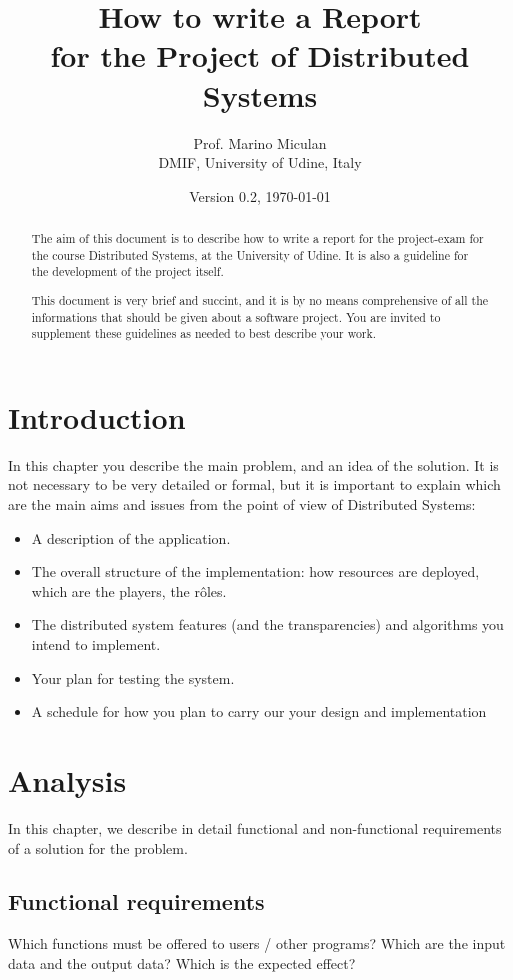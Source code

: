 \documentclass{memoir}
\title{How to write a Report\\ for the Project of Distributed Systems}
\author{Prof. Marino Miculan\\ DMIF, University of Udine, Italy}
\date{Version 0.2, \today}
\begin{document}
\maketitle
\begin{abstract}
The aim of this document is to describe how to write a report for the project-exam for the course Distributed Systems, at the University of Udine.
It is also a guideline for the development of the project itself.

This document is very brief and succint, and it is by no means comprehensive of all the informations that should be given about a software project. You are invited to supplement these guidelines as needed to best describe your work.
\end{abstract}

\chapter{Introduction}\label{ch:intro}

In this chapter you describe the main problem, and an idea of the solution.
It is not necessary to be very detailed or formal, but it is important to explain which are the main aims and issues from the point of view of Distributed Systems:
\begin{itemize}
\item A description of the application.
\item The overall structure of the implementation: how resources are deployed, which are the players, the r\^oles.
\item The distributed system features (and the transparencies) and algorithms you intend to implement.
\item Your plan for testing the system.
\item A schedule for how you plan to carry our your design and implementation
\end{itemize}



\chapter{Analysis}\label{ch:analysis}

In this chapter, we describe in detail functional and non-functional requirements of a solution for the problem.

\section{Functional requirements}
Which functions must be offered to users / other programs?  Which are the input data and the output data? Which is the expected effect? 
\end{document}
